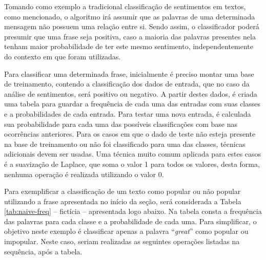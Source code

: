 \documentclass[oneside,openright,12pt]{ufsm_2015} %
\begin{document}
    \par Tomando como exemplo a tradicional classificação de sentimentos em textos, como mencionado, o algoritmo irá assumir que as palavras de uma determinada mensagem não possuem uma relação entre si. Sendo assim, o classificador poderá presumir que uma frase seja positiva, caso a maioria das palavras presentes nela tenham maior probabilidade de ter este mesmo sentimento, independentemente do contexto em que foram utilizadas.
    
    \par Para classificar uma determinada frase, inicialmente é preciso montar uma base de treinamento, contendo a classificação dos dados de entrada, que no caso da análise de sentimentos, será positivo ou negativo. A partir destes dados, é criada uma tabela para guardar a frequência de cada uma das entradas com suas classes e a probabilidades de cada entrada. Para testar uma nova entrada, é calculada sua probabilidade para cada uma das possíveis classificações com base nas ocorrências anteriores. Para os casos em que o dado de teste não esteja presente na base de treinamento ou não foi classificado para uma das classes, técnicas adicionais devem ser usadas. Uma técnica muito comum aplicada para estes casos é a suavização de Laplace, que soma o valor 1 para todos os valores, desta forma, nenhuma operação é realizada utilizando o valor 0.
    
    \par Para exemplificar a classificação de um texto como popular ou não popular utilizando a frase apresentada no início da seção, será considerada a Tabela \ref{tab:naive-freq}  -- fictícia -- apresentada logo abaixo. Na tabela consta a frequência das palavras para cada classe e a probabilidade de cada uma. Para simplificar, o objetivo neste exemplo é classificar apenas a palavra ``\textit{great}'' como popular ou impopular. Neste caso, seriam realizadas as seguintes operações listadas na sequência, após a tabela.
    
\end{document}
